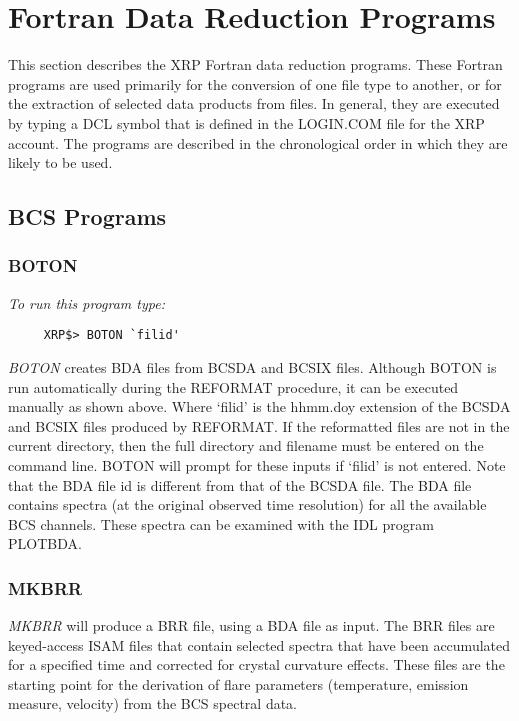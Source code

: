 \section{Fortran Data Reduction Programs}

This section describes the XRP Fortran data reduction programs.
These Fortran programs are used primarily for the conversion of one file type
to another, or for  the extraction of selected data products from files. In
general, they are executed by typing a DCL symbol that is defined in the
LOGIN.COM file for the XRP account. The programs are described in the
chronological order in which they are likely to be used.

\subsection{BCS Programs}

\subsubsection{BOTON}

{\em To run this program type:}
\begin{verbatim}
     XRP$> BOTON `filid'            
\end{verbatim}   
{\em BOTON} creates BDA files from BCSDA and BCSIX files. Although
   BOTON is run automatically during the REFORMAT procedure, it can be
   executed manually as shown above. 
   Where `filid' is the hhmm.doy extension of the BCSDA and BCSIX files
   produced by REFORMAT. If the reformatted files are not in the current
   directory, then the full directory and filename must be entered on the command
   line. BOTON will prompt for these inputs if `filid' is not entered. Note that
   the BDA file id is different from that of the BCSDA file. The BDA file contains
   spectra (at the original observed time resolution) for all the available BCS
   channels. These spectra can be examined with the IDL program PLOTBDA.   

\subsubsection{MKBRR}

  {\em MKBRR} will produce a BRR file, using a BDA file as input.
   The BRR files are keyed-access ISAM files that contain selected spectra that have been
   accumulated  for a specified time and corrected for crystal curvature effects.
   These files are the starting point for the derivation of flare parameters
   (temperature, emission measure, velocity) from the BCS spectral data.

